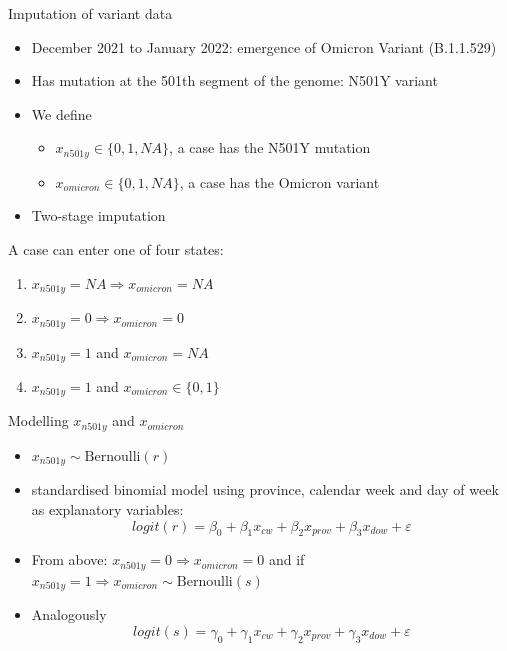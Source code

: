 \documentclass[
  ignorenonframetext,
  aspectratio=169,
]{beamer}
\providecommand{\tightlist}{%
  \setlength{\itemsep}{0pt}\setlength{\parskip}{0pt}}
\newcommand{\mli}[1]{\mathit{#1}}%
\begin{document}
\begin{frame}{Imputation of variant data}
\protect\hypertarget{imputation-of-variant-data}{}
\begin{itemize}
\tightlist
\item
  December 2021 to January 2022: emergence of Omicron Variant
  (B.1.1.529)
\item
  Has mutation at the 501th segment of the genome: N501Y variant
\item
  We define

  \begin{itemize}
  \tightlist
  \item
    \(x_\mli{n501y} \in \{0,1,\mli{NA}\}\), a case has the N501Y
    mutation
  \item
    \(x_\mli{omicron} \in \{0,1,\mli{NA}\}\), a case has the Omicron
    variant
  \end{itemize}
\item
  Two-stage imputation
\end{itemize}

\pause

A case can enter one of four states:

\begin{enumerate}
  \item $x_\mli{n501y}=\mli{NA} \Rightarrow x_\mli{omicron}=\mli{NA}$
  \item $x_\mli{n501y}=0 \Rightarrow x_\mli{omicron}=0$
  \item $x_\mli{n501y}=1$ and $x_\mli{omicron}=\mli{NA}$
  \item $x_\mli{n501y}=1$ and $x_\mli{omicron} \in \{0,1\}$
\end{enumerate}
\end{frame}

\begin{frame}{Modelling \(x_\mli{n501y}\) and \(x_\mli{omicron}\)}
\protect\hypertarget{modelling-x_mlin501y-and-x_mliomicron}{}
\begin{itemize}
\item
  \(x_\mli{n501y} \sim \text{Bernoulli}(r)\)
\item
  standardised binomial model using province, calendar week and day of
  week as explanatory variables:
  \[logit(r) = \beta_0 + \beta_1 x_\mli{cw} + \beta_2 x_\mli{prov} + \beta_3 x_\mli{dow} + \varepsilon\]
  \pause
\item
  From above: \(x_\mli{n501y}=0 \Rightarrow x_\mli{omicron}=0\) and if
  \(x_\mli{n501y}=1 \Rightarrow x_\mli{omicron} \sim \text{Bernoulli}(s)\)
\item
  Analogously
  \[logit(s) = \gamma_0 + \gamma_1 x_\mli{cw} + \gamma_2 x_\mli{prov} + \gamma_3 x_\mli{dow} + \varepsilon\]
\end{itemize}
\end{frame}
\end{document}
